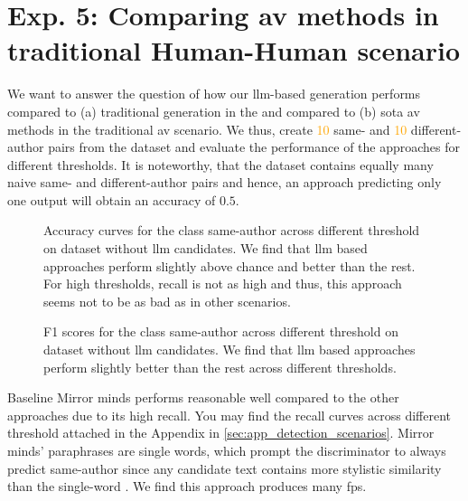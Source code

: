\section{Exp. 5: Comparing \acs{av} methods in traditional Human-Human scenario}

We want to answer the question of how our \ac{llm}-based \imp{} generation performs compared to (a) traditional \imp{} generation in the \impAppr{} and compared to (b) \acl{sota} \ac{av} methods in the traditional \ac{av} scenario.
We thus, create \textcolor{orange}{10} same- and \textcolor{orange}{10} different-author pairs from the \dataStudent{} dataset and evaluate the performance of the approaches for different thresholds.
It is noteworthy, that the dataset contains equally many naive same- and different-author pairs and hence, an approach predicting only one output will obtain an accuracy of $0.5$.

\begin{figure}[htbp]
\centering
    
  \caption{Accuracy curves for the class same-author across different threshold on \dataStudent{} dataset without \ac{llm} candidates. We find that \ac{llm} based approaches perform slightly above chance and better than the rest. For high thresholds, recall is not as high and thus, this approach seems not to be as bad as in other scenarios. 
  }
  \label{fig:human-human_acc}
\end{figure}

\begin{figure}[htbp]
\centering
    
  \caption{F1 scores for the class same-author across different threshold on \dataStudent{} dataset without \ac{llm} candidates. 
  We find that \ac{llm} based approaches perform slightly better than the rest across different thresholds.
  }
  \label{fig:human-human_f1}
\end{figure}

Baseline Mirror minds performs reasonable well compared to the other approaches due to its high recall.
You may find the recall curves across different threshold attached in the Appendix in \autoref{sec:app_detection_scenarios}.
Mirror minds' paraphrases are single words, which prompt the discriminator to always predict same-author since any candidate text contains more stylistic similarity than the single-word \imps{}.
We find this approach produces many \acp{fp}.

